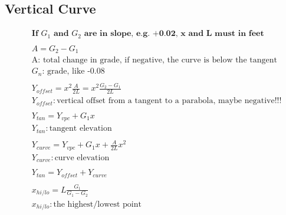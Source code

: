 \documentclass{article}
\begin{document}
  \subsection{Vertical Curve}
  \begin{align*}
    & \textbf{If $G_1$ and $G_2$ are in slope, e.g. +0.02, x and L must in feet}\\
    \\
    & A = G_2 - G_1  \\
    & \text{A: total change in grade, if negative, the curve is below the tangent}\\
    & \text{$G_n$: grade, like -0.08} \\
    \\
    & Y_{offset} = x^2 \frac{A}{2L} = x^2 \frac{G_2 - G_1}{2L} \\
    & Y_{offset}: \text{vertical offset from a tangent to a parabola, maybe negative!!!} \\
    \\
    & Y_{tan} = Y_{vpc} + G_1x \\
    & Y_{tan}: \text{tangent elevation} \\
    \\
    & Y_{curve} = Y_{vpc} + G_1x + \frac{A}{2L}x^2 \\
    & Y_{curve}: \text{curve elevation} \\
    \\
    & Y_{tan} = Y_{offset} + Y_{curve} \\
    \\
    & x_{hi/lo} = L \frac{G_1}{G_1 - G_2} \\
    & x_{hi/lo}: \text{the highest/lowest point}\\
  \end{align*}
\end{document}
